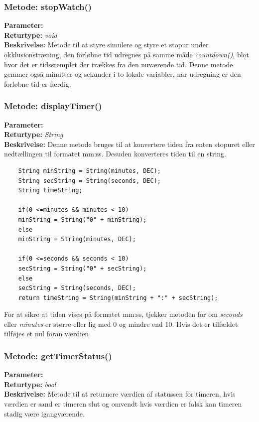 \subsubsection{Metode: stopWatch()}
\textbf{Parameter: } 
\\ \textbf{Returtype: } \textit{void}
\\ \textbf{Beskrivelse: } Metode til at styre simulere og styre et stopur under okklusionstræning, den forløbne tid udregnes på samme måde \textit{countdown()}, blot hvor det er tidsstemplet der trækkes fra den nuværende tid. Denne metode gemmer også minutter og sekunder i to lokale variabler, når udregning er den forløbne tid er færdig. 

\subsubsection{Metode: displayTimer()}
\textbf{Parameter: }
\\ \textbf{Returtype: } \textit{ String}
\\ \textbf{Beskrivelse: } Denne metode bruges til at konvertere tiden fra enten stopuret eller nedtællingen til formatet mm:ss. Desuden konverteres tiden til en string. 
\begin{lstlisting}
	String minString = String(minutes, DEC);
	String secString = String(seconds, DEC);
	String timeString;
	
	if(0 <=minutes && minutes < 10)
	minString = String("0" + minString);
	else
	minString = String(minutes, DEC);
	
	if(0 <=seconds && seconds < 10)
	secString = String("0" + secString);
	else
	secString = String(seconds, DEC);
	return timeString = String(minString + ":" + secString);
\end{lstlisting}
For at sikre at tiden vises på formatet mm:ss, tjekker metoden for om \textit{seconds} eller \textit{minutes} er større eller lig med 0 og mindre end 10. Hvis det er tilfældet tilføjes et nul foran værdien 

\subsubsection{Metode: getTimerStatus()}
\textbf{Parameter: } 
\\ \textbf{Returtype: } \textit{bool}
\\ \textbf{Beskrivelse: } Metode til at returnere værdien af statussen for timeren, hvis værdien er sand er timeren slut og omvendt hvis værdien er falsk kan timeren stadig være igangværende. 

